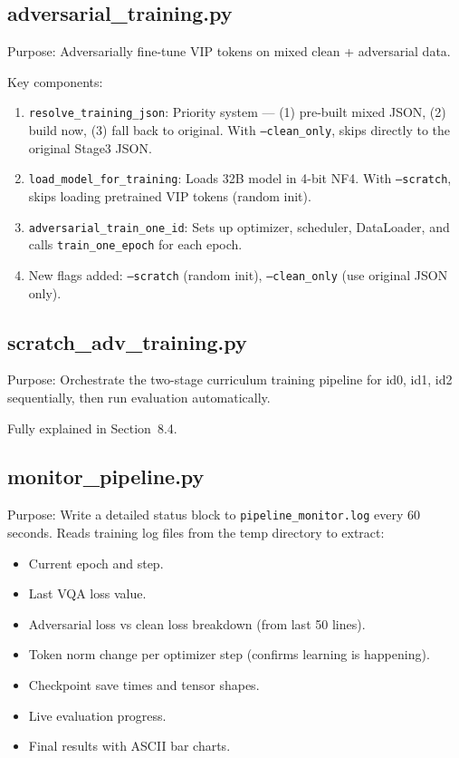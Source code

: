 \documentclass[12pt,a4paper]{article}
\begin{document}
\subsection{adversarial\_training.py}

Purpose: Adversarially fine-tune VIP tokens on mixed clean + adversarial data.

Key components:
\begin{enumerate}
    \item \texttt{resolve\_training\_json}: Priority system --- (1) pre-built mixed JSON, (2) build now, (3) fall back to original. With \texttt{--clean\_only}, skips directly to the original Stage3 JSON.
    \item \texttt{load\_model\_for\_training}: Loads 32B model in 4-bit NF4. With \texttt{--scratch}, skips loading pretrained VIP tokens (random init).
    \item \texttt{adversarial\_train\_one\_id}: Sets up optimizer, scheduler, DataLoader, and calls \texttt{train\_one\_epoch} for each epoch.
    \item New flags added: \texttt{--scratch} (random init), \texttt{--clean\_only} (use original JSON only).
\end{enumerate}

\subsection{scratch\_adv\_training.py}

Purpose: Orchestrate the two-stage curriculum training pipeline for id0, id1, id2 sequentially, then run evaluation automatically.

Fully explained in Section~8.4.

\subsection{monitor\_pipeline.py}

Purpose: Write a detailed status block to \texttt{pipeline\_monitor.log} every 60 seconds. Reads training log files from the temp directory to extract:
\begin{itemize}
    \item Current epoch and step.
    \item Last VQA loss value.
    \item Adversarial loss vs clean loss breakdown (from last 50 lines).
    \item Token norm change per optimizer step (confirms learning is happening).
    \item Checkpoint save times and tensor shapes.
    \item Live evaluation progress.
    \item Final results with ASCII bar charts.
\end{itemize}
\end{document}
